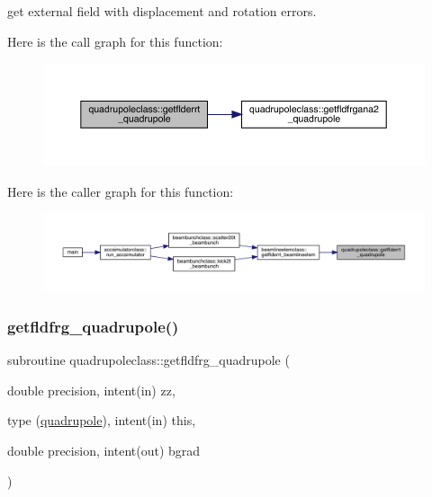 get external field with displacement and rotation errors. 

Here is the call graph for this function\+:\nopagebreak
\begin{figure}[H]
\begin{center}
\leavevmode
\includegraphics[width=350pt]{namespacequadrupoleclass_a25a1f7329a298c01c802f96b0547ab6c_cgraph}
\end{center}
\end{figure}
Here is the caller graph for this function\+:\nopagebreak
\begin{figure}[H]
\begin{center}
\leavevmode
\includegraphics[width=350pt]{namespacequadrupoleclass_a25a1f7329a298c01c802f96b0547ab6c_icgraph}
\end{center}
\end{figure}
\mbox{\label{namespacequadrupoleclass_a28a961157d94669d59f8c6f024995899}} 
\subsubsection{\texorpdfstring{getfldfrg\_quadrupole()}{getfldfrg\_quadrupole()}}
{\footnotesize\ttfamily subroutine quadrupoleclass\+::getfldfrg\+\_\+quadrupole (\begin{DoxyParamCaption}\item[{double precision, intent(in)}]{zz,  }\item[{type (\mbox{\hyperlink{namespacequadrupoleclass_structquadrupoleclass_1_1quadrupole}{quadrupole}}), intent(in)}]{this,  }\item[{double precision, intent(out)}]{bgrad }\end{DoxyParamCaption})}



